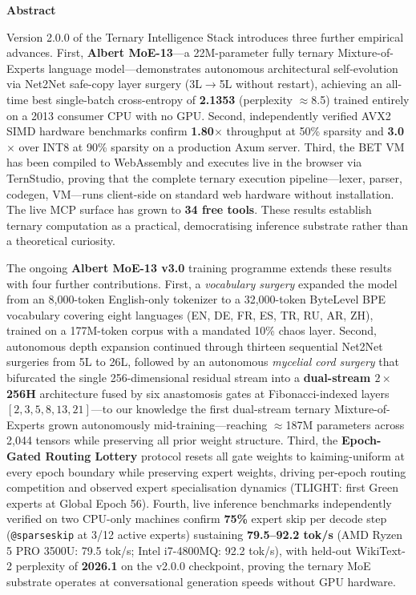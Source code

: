 \documentclass[11pt,a4paper]{article}
\renewenvironment{abstract}{%
  \par\medskip
  {\centering\bfseries Abstract\par}\nopagebreak\smallskip
  \list{}{%
    \setlength{\leftmargin}{0.085\linewidth}%
    \setlength{\rightmargin}{0.085\linewidth}%
    \setlength{\parsep}{0.4em}%
    \setlength{\topsep}{0pt}}%
  \item\relax\small}%
  {\endlist\par\medskip}
\begin{document}
\begin{abstract}
Version 2.0.0 of the Ternary Intelligence Stack introduces three further
empirical advances. First, \textbf{Albert MoE-13}---a 22M-parameter fully ternary
Mixture-of-Experts language model---demonstrates autonomous architectural
self-evolution via Net2Net safe-copy layer surgery (3L$\to$5L without restart),
achieving an all-time best single-batch cross-entropy of \textbf{2.1353}
(perplexity $\approx$8.5) trained entirely on a 2013 consumer CPU with no GPU.
Second, independently verified AVX2 SIMD hardware benchmarks confirm
\textbf{1.80$\times$} throughput at 50\% sparsity and \textbf{3.0$\times$} over
INT8 at 90\% sparsity on a production Axum server. Third, the BET VM has been
compiled to WebAssembly and executes live in the browser via TernStudio, proving
that the complete ternary execution pipeline---lexer, parser, codegen, VM---runs
client-side on standard web hardware without installation. The live MCP surface
has grown to \textbf{34 free tools}. These results establish ternary computation
as a practical, democratising inference substrate rather than a theoretical
curiosity.

The ongoing \textbf{Albert MoE-13 v3.0} training programme extends these results
with four further contributions. First, a \emph{vocabulary surgery} expanded the
model from an 8,000-token English-only tokenizer to a 32,000-token ByteLevel BPE
vocabulary covering eight languages (EN, DE, FR, ES, TR, RU, AR, ZH), trained on a
177M-token corpus with a mandated 10\% chaos layer. Second, autonomous depth
expansion continued through thirteen sequential Net2Net surgeries from 5L to 26L,
followed by an autonomous \emph{mycelial cord surgery} that bifurcated the single
256-dimensional residual stream into a \textbf{dual-stream $2\times$256H}
architecture fused by six anastomosis gates at Fibonacci-indexed layers
$[2,3,5,8,13,21]$---to our knowledge the first dual-stream ternary Mixture-of-Experts
grown autonomously mid-training---reaching $\approx$187M parameters across 2{,}044
tensors while preserving all prior weight structure. Third,
the \textbf{Epoch-Gated Routing Lottery} protocol resets all gate weights to
kaiming-uniform at every epoch boundary while preserving expert weights, driving
per-epoch routing competition and observed expert specialisation dynamics
(TLIGHT: first Green experts at Global Epoch 56). Fourth, live inference benchmarks
independently verified on two CPU-only machines confirm \textbf{75\%} expert skip
per decode step (\texttt{@sparseskip} at 3/12 active experts) sustaining
\textbf{79.5--92.2 tok/s} (AMD Ryzen 5 PRO 3500U: 79.5 tok/s; Intel i7-4800MQ:
92.2 tok/s), with held-out WikiText-2 perplexity of \textbf{2026.1} on the v2.0.0
checkpoint, proving the ternary MoE substrate operates at conversational generation
speeds without GPU hardware.
\end{abstract}
\end{document}
